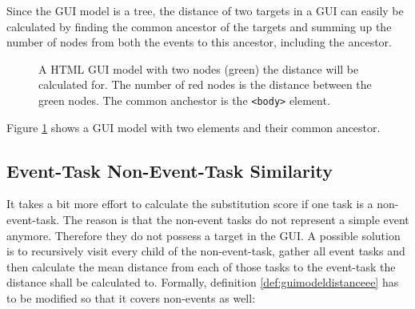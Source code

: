 Since the GUI model is a tree, the distance of two targets in a GUI can easily be calculated by finding the common ancestor of the targets and summing up the number of nodes from both the events to this ancestor, including the ancestor.
\begin{figure}
\begin{center}
\end{center}	
\label{fig:guimodeldistance}
\caption{A HTML GUI model with two nodes (green) the distance will be calculated for.  The number of red nodes is the distance between the green nodes. The common anchestor is the \texttt{<body>} element.}

\end{figure}
Figure \ref{fig:guimodeldistance} shows a GUI model with two elements and their common ancestor. 


\subsection{Event-Task Non-Event-Task Similarity}
It takes a bit more effort to calculate the substitution score if one task is a non-event-task. 
The reason is that the non-event tasks do not represent a simple event anymore. Therefore they do not possess a target in the GUI.
A possible solution is to recursively visit every child of the non-event-task, gather all event tasks and then calculate the mean distance from each of those tasks to the event-task the distance shall be calculated to.
Formally, definition \ref{def:guimodeldistanceee} has to be modified so that it covers non-events as well:

